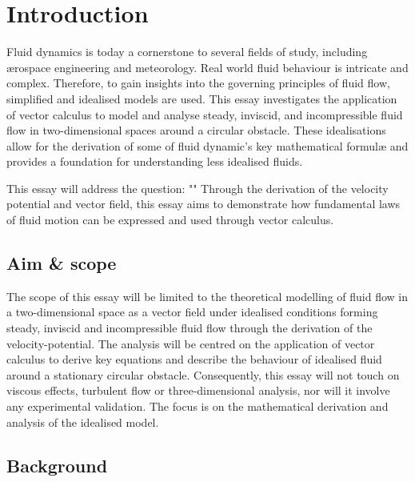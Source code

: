 \section{Introduction}
Fluid dynamics is today a cornerstone to several fields of study, including ærospace engineering and meteorology.
Real world fluid behaviour is intricate and complex. Therefore, to gain insights into the governing principles of
fluid flow, simplified and idealised models are used. This essay investigates the application of vector calculus
to model and analyse steady, inviscid, and incompressible fluid flow in two-dimensional spaces around a circular
obstacle. These idealisations allow for the derivation of some of fluid dynamic's key mathematical formulæ and
provides a foundation for understanding less idealised fluids.

This essay will address the question: "\researchquestion" Through the derivation of the velocity potential and
vector field, this essay aims to demonstrate how fundamental laws of fluid motion can be expressed and used through
vector calculus.

\subsection{Aim \& scope}
The scope of this essay will be limited to the theoretical modelling of fluid flow in a two-dimensional space
as a vector field under idealised conditions forming steady, inviscid and incompressible fluid flow through the 
derivation of the velocity-potential. The analysis will be centred on the application of vector calculus to derive
key equations and describe the behaviour of idealised fluid around a stationary circular obstacle. Consequently, this essay
will not touch on viscous effects, turbulent flow or three-dimensional analysis, nor will it involve any experimental 
validation. The focus is on the mathematical derivation and analysis of the idealised model.

\subsection{Background}
